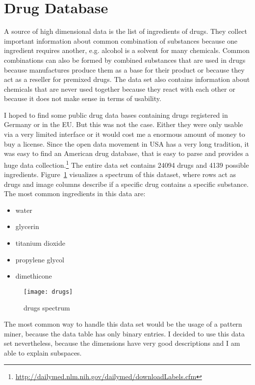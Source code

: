 \section{Drug Database}
A source of high dimensional data is the list of ingredients of drugs. They collect important information about common combination of substances because one ingredient requires another, e.g. alcohol is a solvent for many chemicals. Common combinations can also be formed by combined substances that are used in drugs because manufactures produce them as a base for their product or because they act as a reseller for premixed drugs. The data set also contains information about chemicals that are never used together because they react with each other or because it does not make sense in terms of usability.

I hoped to find some public drug data bases containing drugs registered in Germany or in the EU. But this was not the case. Either they were only usable via a very limited interface or it would cost me a enormous amount of money to buy a license. Since the open data movement in USA has a very long tradition, it was easy to find an American drug database, that is easy to parse and provides a huge data collection.\footnote{\url{http://dailymed.nlm.nih.gov/dailymed/downloadLabels.cfm}} The entire data set contains \num{24094} drugs and \num{4139} possible ingredients. Figure~\ref{fig:drugs} visualizes a spectrum of this dataset, where rows act as drugs and image columns describe if a specific drug contains a specific substance. The most common ingredients in this data are:
\begin{itemize}
	\item water
	\item glycerin
	\item titanium dioxide
	\item propylene glycol
	\item dimethicone
\end{itemize}

\begin{figure}
	\texttt{[image: drugs]}
	\caption{drugs spectrum}
	\label{fig:drugs}
\end{figure}

The most common way to handle this data set would be the usage of a pattern miner, because the data table has only binary entries. I decided to use this data set nevertheless, because the dimensions have very good descriptions and I am able to explain subspaces.

